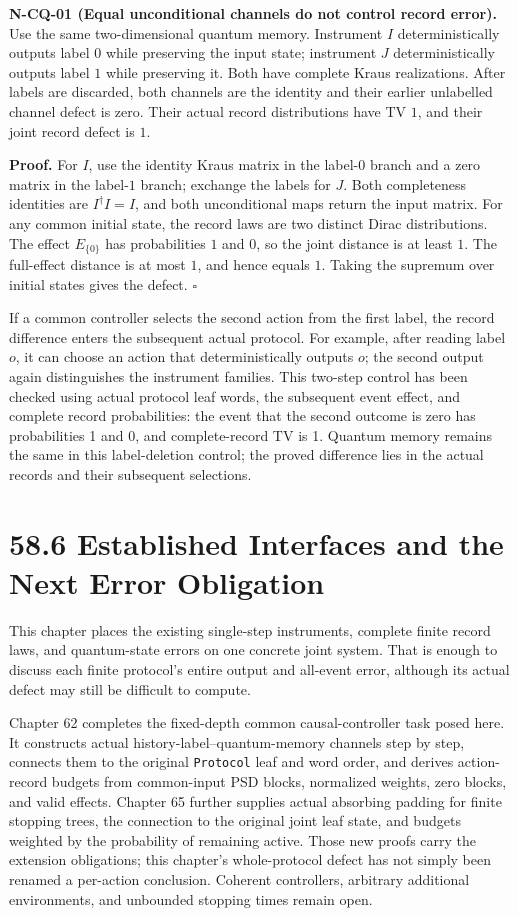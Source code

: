 \documentclass[
  11pt,
  oneside]{book}
\begin{document}
\label{n-cq-01}{}

\textbf{N-CQ-01 (Equal unconditional channels do not control record
error).} Use the same two-dimensional quantum memory. Instrument \(I\)
deterministically outputs label \(0\) while preserving the input state;
instrument \(J\) deterministically outputs label \(1\) while preserving
it. Both have complete Kraus realizations. After labels are discarded,
both channels are the identity and their earlier unlabelled channel
defect is zero. Their actual record distributions have TV \(1\), and
their joint record defect is \(1\).

\textbf{Proof.} For \(I\), use the identity Kraus matrix in the
label-\(0\) branch and a zero matrix in the label-\(1\) branch; exchange
the labels for \(J\). Both completeness identities are
\(I^\dagger I=I\), and both unconditional maps return the input matrix.
For any common initial state, the record laws are two distinct Dirac
distributions. The effect \(E_{\{0\}}\) has probabilities \(1\) and
\(0\), so the joint distance is at least \(1\). The full-effect distance
is at most \(1\), and hence equals \(1\). Taking the supremum over
initial states gives the defect. \(\square\)

If a common controller selects the second action from the first label,
the record difference enters the subsequent actual protocol. For
example, after reading label \(o\), it can choose an action that
deterministically outputs \(o\); the second output again distinguishes
the instrument families. This two-step control has been checked using
actual protocol leaf words, the subsequent event effect, and complete
record probabilities: the event that the second outcome is zero has
probabilities 1 and 0, and complete-record TV is 1. Quantum memory
remains the same in this label-deletion control; the proved difference
lies in the actual records and their subsequent selections.

\section{58.6 Established Interfaces and the Next Error Obligation}

This chapter places the existing single-step instruments, complete
finite record laws, and quantum-state errors on one concrete joint
system. That is enough to discuss each finite protocol's entire output
and all-event error, although its actual defect may still be difficult
to compute.

Chapter 62 completes the fixed-depth common causal-controller task posed
here. It constructs actual history-label--quantum-memory channels step
by step, connects them to the original \texttt{Protocol} leaf and word
order, and derives action-record budgets from common-input PSD blocks,
normalized weights, zero blocks, and valid effects. Chapter 65 further
supplies actual absorbing padding for finite stopping trees, the
connection to the original joint leaf state, and budgets weighted by the
probability of remaining active. Those new proofs carry the extension
obligations; this chapter's whole-protocol defect has not simply been
renamed a per-action conclusion. Coherent controllers, arbitrary
additional environments, and unbounded stopping times remain open.
\end{document}
